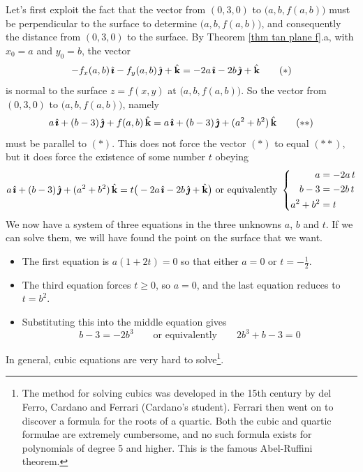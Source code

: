 \begin{eg}[Optional]
Let's first exploit the fact that the vector
from $(0,3,0)$ to $\big(a,b,f(a,b)\big)$ must be perpendicular to the surface
to determine $\big(a,b,f(a,b)\big)$, and consequently
the distance from $(0,3,0)$ to the surface. By Theorem \ref{thm tan plane f}.a,
with $x_0=a$ and $y_0=b$, the vector 
\begin{equation*}
-f_x(a,b)\,\hat{\pmb{\imath}} - f_y(a,b)\,\hat{\pmb{\jmath}} +\hat{\mathbf{k}}
=-2a\,\hat{\pmb{\imath}} -2b\,\hat{\pmb{\jmath}} +\hat{\mathbf{k}}
\tag{$*$}\end{equation*}
is normal to the surface $z=f(x,y)$ at $\big(a,b,f(a,b)\big)$.
So the vector from $(0,3,0)$ to $\big(a,b,f(a,b)\big)$, namely
\begin{equation*}
a\,\hat{\pmb{\imath}} + (b-3)\,\hat{\pmb{\jmath}} + f(a,b)\,\hat{\mathbf{k}}
=a\,\hat{\pmb{\imath}} + (b-3)\,\hat{\pmb{\jmath}} + (a^2+b^2)\,\hat{\mathbf{k}}
\tag{$**$}\end{equation*}
must be parallel to $(*)$. This does not force the vector $(*)$ to 
equal $(**)$, but it does force the existence of some number $t$ obeying
\begin{equation*}
a\,\hi + (b-3)\,\hj + (a^2+b^2)\,\hk
=t\big(-2a\,\hi -2b\,\hj +\hk\big)\ 
\text{or equivalently}\ 
\left\{\begin{aligned}
a&=-2a\,t\\
b-3 &= -2b\,t\\
a^2+b^2 &= t
\end{aligned}\right.
\end{equation*}
We now have a system of three equations in the three unknowns $a$, $b$ 
and $t$. If we can solve them, we will have found the point on the surface
that we want.
\begin{itemize}
\item 
The first equation is $a(1+2t)=0$ so that either $a=0$ or $t=-\frac{1}{2}$.
\item
The third equation forces $t\ge 0$, so $a=0$, and the last equation reduces to
$t=b^2$. 
\item
Substituting this into the middle equation gives
\begin{equation*}
b-3=-2b^3\qquad\text{or equivalently}\qquad
2b^3+b-3 = 0
\end{equation*}
\end{itemize}
In general, cubic equations are very hard to solve\footnote{The method 
for solving cubics was developed in the 15th century by 
del Ferro, Cardano and Ferrari (Cardano's student). Ferrari then went 
on to discover a formula for the roots of a quartic. Both the cubic and quartic
formulae are extremely cumbersome, and no such formula exists for 
polynomials of degree 5 and higher. This is the famous Abel-Ruffini theorem.}.

\end{eg}
